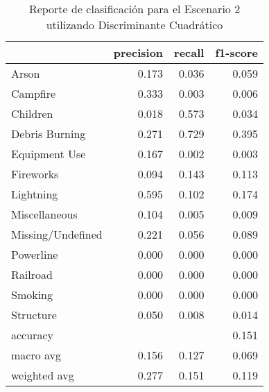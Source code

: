 \begin{table}
\centering
\caption{Reporte de clasificación para el Escenario 2 utilizando Discriminante Cuadrático}
\label{tab:DC_Escenario 2}
\begin{tabular}{lrrr}
\toprule
{} &  precision &  recall &  f1-score \\
\midrule
Arson             &      0.173 &   0.036 &     0.059 \\
Campfire          &      0.333 &   0.003 &     0.006 \\
Children          &      0.018 &   0.573 &     0.034 \\
Debris Burning    &      0.271 &   0.729 &     0.395 \\
Equipment Use     &      0.167 &   0.002 &     0.003 \\
Fireworks         &      0.094 &   0.143 &     0.113 \\
Lightning         &      0.595 &   0.102 &     0.174 \\
Miscellaneous     &      0.104 &   0.005 &     0.009 \\
Missing/Undefined &      0.221 &   0.056 &     0.089 \\
Powerline         &      0.000 &   0.000 &     0.000 \\
Railroad          &      0.000 &   0.000 &     0.000 \\
Smoking           &      0.000 &   0.000 &     0.000 \\
Structure         &      0.050 &   0.008 &     0.014 \\
accuracy          &            &         &     0.151 \\
macro avg         &      0.156 &   0.127 &     0.069 \\
weighted avg      &      0.277 &   0.151 &     0.119 \\
\bottomrule
\end{tabular}
\end{table}
